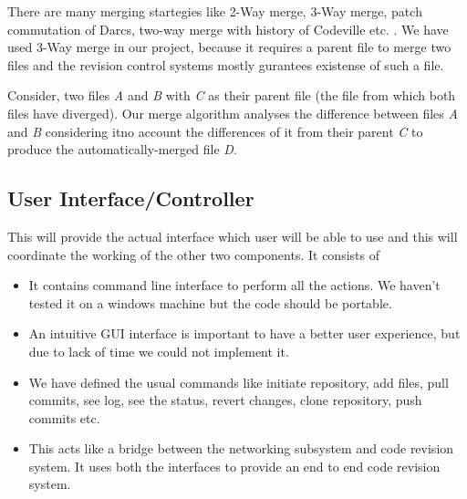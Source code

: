 \documentclass[12pt]{article}
\begin{document}
There are many merging startegies like 2-Way merge, 3-Way merge, patch commutation of Darcs,  two-way merge with history of Codeville etc. \cite{WIKIMERGE}.
We have used 3-Way merge in our project, because it requires a parent file to merge two files and the revision control systems mostly gurantees existense of such a file.

Consider, two files \emph{A} and \emph{B} with \emph{C} as their parent file (the file from which both files have diverged). Our merge algorithm analyses the difference between files \emph{A} and \emph{B} considering itno account the differences of it from their parent \emph{C} to produce the automatically-merged file \emph{D}.

\subsection{User Interface/Controller}
This will provide the actual interface which user will be able to use and this
will coordinate the working of the other two components.
It consists of
\begin{itemize}
\item It contains command line interface to perform all the actions. We
  haven't tested it on a windows machine but the code should be portable.
\item An intuitive GUI interface is important to have a better user
  experience, but due to lack of time we could not implement it.
\item We have defined the usual commands like initiate repository, add files,
  pull commits, see log, see the status, revert changes, clone repository,
  push commits etc.
\item This acts like a bridge between the networking subsystem and code
  revision system. It uses both the interfaces to provide an end to end code
  revision system.
\end{itemize}
\end{document}
